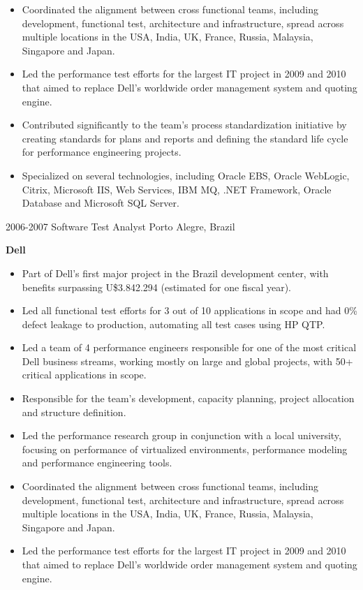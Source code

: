 \begin{entrylist}
{\begin{itemize}
        \item Coordinated the alignment between cross functional teams, including development, functional test, architecture and infrastructure, spread across multiple locations  in the USA, India, UK, France, Russia, Malaysia, Singapore and Japan.
        \item Led the performance test efforts for the largest IT project in 2009 and 2010 that aimed to replace Dell’s worldwide order management system and quoting engine.
        \item Contributed significantly to the team’s process standardization initiative by creating standards for plans and reports and defining the standard life cycle for performance engineering projects.
        \item Specialized on several technologies, including Oracle EBS, Oracle WebLogic, Citrix, Microsoft IIS, Web Services, IBM MQ, .NET Framework, Oracle Database and Microsoft SQL Server.
      \end{itemize}
    }
  \entry
    {2006-2007}
    {Software Test Analyst}
    {Porto Alegre, Brazil}
    {
      \textbf{Dell}
      \begin{itemize}
        \item Part of Dell’s first major project in the Brazil development center, with benefits surpassing U\$3.842.294 (estimated for one fiscal year).
        \item Led all functional test efforts for 3 out of 10 applications in scope and had 0\% defect leakage to production, automating all test cases using HP QTP.
        \item Led a team of 4 performance engineers responsible for one of the most critical Dell business streams, working mostly on large and global projects, with 50+ critical applications in scope.
        \item Responsible for the team’s development, capacity planning, project allocation and structure definition.
        \item Led the performance research group in conjunction with a local university, focusing on performance of virtualized environments, performance modeling and performance engineering tools.
        \item Coordinated the alignment between cross functional teams, including development, functional test, architecture and infrastructure, spread across multiple locations  in the USA, India, UK, France, Russia, Malaysia, Singapore and Japan.
        \item Led the performance test efforts for the largest IT project in 2009 and 2010 that aimed to replace Dell’s worldwide order management system and quoting engine.

\end{itemize}}
\end{entrylist}
